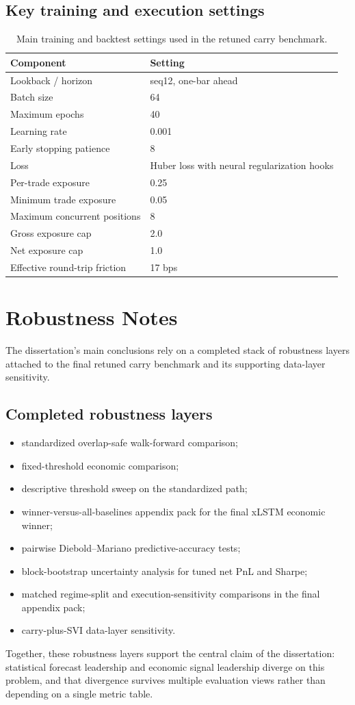 \documentclass[12pt]{report}
\begin{document}
\section{Key training and execution settings}
\begin{table}[H]
\centering
\caption{Main training and backtest settings used in the retuned carry benchmark.}
\footnotesize
\renewcommand{\arraystretch}{1.15}
\begin{tabularx}{\textwidth}{@{}lY@{}}
\toprule
\textbf{Component} & \textbf{Setting} \\
\midrule
Lookback / horizon & seq12, one-bar ahead \\
Batch size & 64 \\
Maximum epochs & 40 \\
Learning rate & 0.001 \\
Early stopping patience & 8 \\
Loss & Huber loss with neural regularization hooks \\
Per-trade exposure & 0.25 \\
Minimum trade exposure & 0.05 \\
Maximum concurrent positions & 8 \\
Gross exposure cap & 2.0 \\
Net exposure cap & 1.0 \\
Effective round-trip friction & 17 bps \\
\bottomrule
\end{tabularx}
\end{table}

\chapter{Robustness Notes}
The dissertation's main conclusions rely on a completed stack of robustness layers attached to the final retuned carry benchmark and its supporting data-layer sensitivity.

\section{Completed robustness layers}
\begin{itemize}[leftmargin=1.2cm]
    \item standardized overlap-safe walk-forward comparison;
    \item fixed-threshold economic comparison;
    \item descriptive threshold sweep on the standardized path;
    \item winner-versus-all-baselines appendix pack for the final xLSTM economic winner;
    \item pairwise Diebold--Mariano predictive-accuracy tests;
    \item block-bootstrap uncertainty analysis for tuned net PnL and Sharpe;
    \item matched regime-split and execution-sensitivity comparisons in the final appendix pack;
    \item carry-plus-SVI data-layer sensitivity.
\end{itemize}

Together, these robustness layers support the central claim of the dissertation: statistical forecast leadership and economic signal leadership diverge on this problem, and that divergence survives multiple evaluation views rather than depending on a single metric table.
\end{document}
